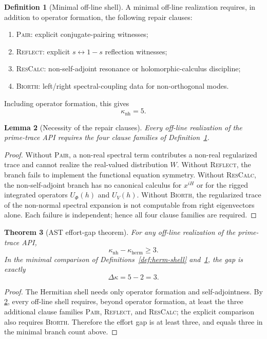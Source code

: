 \documentclass[11pt,a4paper]{article}
\theoremstyle{plain}
\newtheorem{theorem}{Theorem}[section]
\newtheorem{lemma}[theorem]{Lemma}
\theoremstyle{definition}
\newtheorem{definition}[theorem]{Definition}
\newcommand{\effort}{\kappa}
\newcommand{\herm}{\mathrm{herm}}
\newcommand{\nonherm}{\mathrm{nh}}
\begin{document}
\begin{definition}[Minimal off-line shell]
\label{def:nh-shell}
A minimal off-line realization requires, in addition to operator formation, the following repair clauses:
\begin{enumerate}[label=(N\arabic*),nosep]
  \item \textsc{Pair}: explicit conjugate-pairing witnesses;
  \item \textsc{Reflect}: explicit $s\leftrightarrow 1-s$ reflection witnesses;
  \item \textsc{ResCalc}: non-self-adjoint resonance or holomorphic-calculus discipline;
  \item \textsc{Biorth}: left/right spectral-coupling data for non-orthogonal modes.
\end{enumerate}
Including operator formation, this gives
\[
  \effort_{\nonherm}=5.
\]
\end{definition}

\begin{lemma}[Necessity of the repair clauses]
\label{lem:repairs-necessary}
Every off-line realization of the prime-trace API requires the four clause families of Definition~\ref{def:nh-shell}.
\end{lemma}

\begin{proof}
Without \textsc{Pair}, a non-real spectral term contributes a non-real regularized trace and cannot realize the real-valued distribution $W$. Without \textsc{Reflect}, the branch fails to implement the functional equation symmetry. Without \textsc{ResCalc}, the non-self-adjoint branch has no canonical calculus for $x^{iH}$ or for the rigged integrated operators $U_{\Phi}(h)$ and $U_V(h)$. Without \textsc{Biorth}, the regularized trace of the non-normal spectral expansion is not computable from right eigenvectors alone. Each failure is independent; hence all four clause families are required.
\end{proof}

\begin{theorem}[AST effort-gap theorem]
\label{thm:gap}
For any off-line realization of the prime-trace API,
\[
  \effort_{\nonherm}-\effort_{\herm}\ge 3.
\]
In the minimal comparison of Definitions~\ref{def:herm-shell} and~\ref{def:nh-shell}, the gap is exactly
\[
  \Delta\effort = 5-2=3.
\]
\end{theorem}

\begin{proof}
The Hermitian shell needs only operator formation and self-adjointness. By \cref{lem:repairs-necessary}, every off-line shell requires, beyond operator formation, at least the three additional clause families \textsc{Pair}, \textsc{Reflect}, and \textsc{ResCalc}; the explicit comparison also requires \textsc{Biorth}. Therefore the effort gap is at least three, and equals three in the minimal branch count above.
\end{proof}
\end{document}
